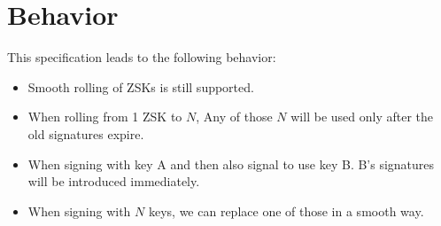 \documentclass[twoside, a4paper]{article}
\begin{document}
\section{Behavior}

This specification leads to the following behavior:

\begin{itemize}
\item Smooth rolling of ZSKs is still supported.
\item When rolling from 1 ZSK to $N$, Any of those $N$ will be used only
after the old signatures expire.
\item When signing with key A and then also signal to use key B. B's
signatures will be introduced immediately.
\item When signing with $N$ keys, we can replace one of those in a 
smooth way. 
\end{itemize}
\end{document}
